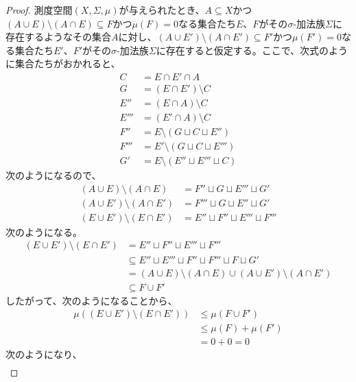 \documentclass[dvipdfmx]{jsarticle}
\begin{document}
\begin{proof}
測度空間$(X,\varSigma,\mu)$が与えられたとき、$A \subseteq X$かつ$(A \cup E) \setminus (A \cap E) \subseteq F$かつ$\mu(F) = 0$なる集合たち$E$、$F$がその$\sigma$-加法族$\varSigma$に存在するようなその集合$A$に対し、$\left( A \cup E' \right) \setminus \left( A \cap E' \right) \subseteq F'$かつ$\mu\left( F' \right) = 0$なる集合たち$E'$、$F'$がその$\sigma$-加法族$\varSigma$に存在すると仮定する。ここで、次式のように集合たちがおかれると、
\begin{align*}
C &= E \cap E' \cap A\\
G &= \left( E \cap E' \right) \setminus C\\
E'' &= (E \cap A) \setminus C\\
E''' &= \left( E' \cap A \right) \setminus C\\
F'' &= E \setminus \left( G \sqcup C \sqcup E'' \right)\\
F''' &= E' \setminus \left( G \sqcup C \sqcup E''' \right)\\
G' &= E \setminus \left( E'' \sqcup E''' \sqcup C \right)
\end{align*}
次のようになるので、
\begin{align*}
(A \cup E) \setminus (A \cap E) &= F'' \sqcup G \sqcup E''' \sqcup G'\\
\left( A \cup E' \right) \setminus \left( A \cap E' \right) &= F''' \sqcup G \sqcup E'' \sqcup G'\\
\left( E \cup E' \right) \setminus \left( E \cap E' \right) &= E'' \sqcup F'' \sqcup E''' \sqcup F'''
\end{align*}
次のようになる。
\begin{align*}
\left( E \cup E' \right) \setminus \left( E \cap E' \right) &= E'' \sqcup F'' \sqcup E''' \sqcup F'''\\
&\subseteq E'' \sqcup E''' \sqcup F'' \sqcup F''' \sqcup F \sqcup G'\\
&= (A \cup E) \setminus (A \cap E) \cup \left( A \cup E' \right) \setminus \left( A \cap E' \right)\\
&\subseteq F \cup F'
\end{align*}
したがって、次のようになることから、
\begin{align*}
\mu\left( \left( E \cup E' \right) \setminus \left( E \cap E' \right) \right) &\leq \mu\left( F \cup F' \right)\\
&\leq \mu(F) + \mu\left( F' \right)\\
&= 0 + 0 = 0
\end{align*}
次のようになり、
\begin{align*}

\end{align*}
\end{proof}
\end{document}
